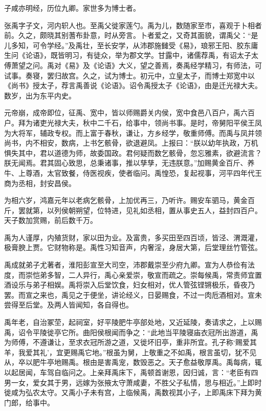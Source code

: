 \documentclass[]{article}
\begin{document}
子咸亦明经，历位九卿。家世多为博士者。

张禹字子文，河内轵人也。至禹父徙家莲勺。禹为儿，数随家至市，喜观于卜相者前。久之，颇晓其别蓍布卦意，时从旁言。卜者爱之，又奇其面貌，谓禹父：``是儿多知，可令学经。''及禹壮，至长安学，从沛郡施雠受《易》，琅邪王阳、胶东庸生问《论语》，既皆明习，有徒众，举为郡文学。甘露中，诸儒荐禹，有诏太子太傅萧望之问。禹对《易》及《论语》大义，望之善焉，奏禹经学精习，有师法，可试事。奏寝，罢归故宫。久之，试为博士。初元中，立皇太子，而博士郑宽中以《尚书》授太子，荐言禹善说《论语》。诏令禹授太子《论语》，由是迁光禄大夫。数岁，出为东平内史。

元帝崩，成帝即位，征禹、宽中，皆以师赐爵关内侯，宽中食邑八百户，禹六百户。拜为诸吏光禄大夫，秋中二千石，给事中，领尚书事。是时，帝舅阳平侯王凤为大将军，辅政专权。而上富于春秋，谦让，方乡经学，敬重师傅。而禹与凤并领尚书，内不相安，数病，上书乞骸骨，欲退避凤。上报曰：``朕以幼年执政，万机惧失其中，君以道德为师，故委国政。君何疑而数乞骸骨，忽忘雅素，欲避流言？朕无闻焉。君其固心致思，总秉诸事，推以孳孳，无违朕意。''加赐黄金百斤、养牛、上尊酒，太官致餐，侍医视疾，使者临问。禹惶恐，复起视事，河平四年代王商为丞相，封安昌侯。

为相六岁，鸿嘉元年以老病乞骸骨，上加优再三，乃听许。赐安车驷马，黄金百斤，罢就第，以列侯朝朔望，位特进，见礼如丞相，置从事史五人，益封四百户。天子数加赏赐，前后数千万。

禹为人谨厚，内殖货财，家以田为业。及富贵，多买田至四百顷，皆泾、渭溉灌，极膏腴上贾。它财物称是。禹性习知音声，内奢淫，身居大第，后堂理丝竹管弦。

禹成就弟子尤著者，淮阳彭宣至大司空，沛郡戴崇至少府九卿。宣为人恭俭有法度，而崇恺弟多智，二人异行，禹心亲爱崇，敬宣而疏之。崇每候禹，常责师宜置酒设乐与弟子相娱。禹将崇入后堂饮食，妇女相对，优人管弦铿锵极乐，昏夜乃罢。而宣之来也，禹见之于便坐，讲论经义，日晏赐食，不过一肉卮酒相对。宣未尝得至后堂。及两人皆闻知，各自得也。

禹年老，自治冢茔，起祠室，好平陵肥牛亭部处地，又近延陵，奏请求之，上以赐禹，诏令平陵徙亭它所。曲阳侯根闻而争之：``此地当平陵寝庙衣冠所出游道，禹为师傅，不遵谦让，至求衣冠所游之道，又徙坏旧亭，重非所宜。孔子称`赐爱其羊，我爱其礼'，宜更赐禹它地。''根虽为舅，上敬重之不如禹，根言虽切，犹不见从，卒以肥牛亭地赐禹。根由是害禹宠，数毁恶之。天子愈益敬厚禹。禹每病，辄以起居闻，车驾自临问之。上亲拜禹床下，禹顿首谢恩，因归诚，言：``老臣有四男一女，爱女其于男，远嫁为张掖太守萧咸妻，不胜父子私情，思与相近。''上即时徙咸为弘农太守。又禹小子未有宫，上临候禹，禹数视其小子，上即禹床下拜为黄门郎，给事中。
\end{document}
